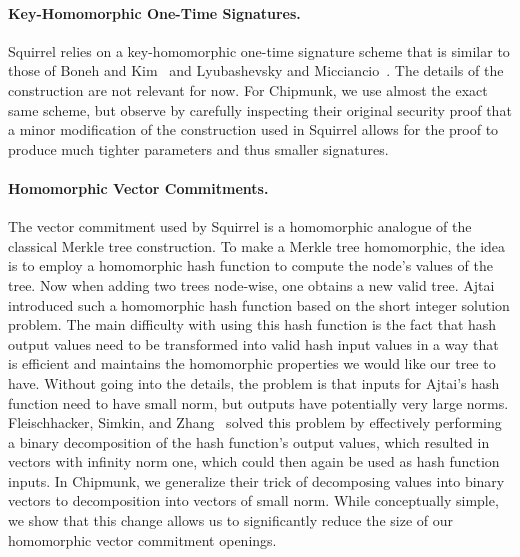 \paragraph{Key-Homomorphic One-Time Signatures.}
Squirrel relies on a key-homomorphic one-time signature scheme that is similar to those of Boneh and Kim~\cite{BonKim2020} and Lyubashevsky and Micciancio~\cite{TCC:LyuMic08}.
The details of the construction are not relevant for now.
For Chipmunk, we use almost the exact same scheme, but observe by carefully inspecting their original security proof that a minor modification of the construction used in Squirrel allows for the proof to produce much tighter parameters and thus smaller signatures.

\paragraph{Homomorphic Vector Commitments.}
The vector commitment used by Squirrel is a homomorphic analogue of the classical Merkle tree construction.
To make a Merkle tree homomorphic, the idea is to employ a homomorphic hash function to compute the node's values of the tree.
Now when adding two trees node-wise, one obtains a new valid tree.
Ajtai~\cite{ICALP:Ajtai99} introduced such a homomorphic hash function based on the short integer solution problem.
The main difficulty with using this hash function is the fact that hash output values need to be transformed into valid hash input values in a way that is efficient and maintains the homomorphic properties we would like our tree to have.
Without going into the details, the problem is that inputs for Ajtai's hash function need to have small norm, but outputs have potentially very large norms.
Fleischhacker, Simkin, and Zhang~\cite{CCS:FleSimZha22} solved this problem by effectively performing a binary decomposition of the hash function's output values, which resulted in vectors with infinity norm one, which could then again be used as hash function inputs.
In Chipmunk, we generalize their trick of decomposing values into binary vectors to decomposition into vectors of small norm.
While conceptually simple, we show that this change allows us to significantly reduce the size of our homomorphic vector commitment openings.

